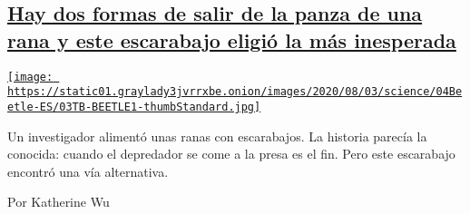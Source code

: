 \begin{enumerate}
\begin{enumerate}
{    \subsection{\texorpdfstring{\href{/es/2020/08/04/espanol/ciencia-y-tecnologia/escarabajo-excremento-rana.html}{Hay
    dos formas de salir de la panza de una rana y este escarabajo eligió
    la más
    inesperada}}{Hay dos formas de salir de la panza de una rana y este escarabajo eligió la más inesperada}}\label{hay-dos-formas-de-salir-de-la-panza-de-una-rana-y-este-escarabajo-eligiuxf3-la-muxe1s-inesperada}}

    \href{/es/2020/08/04/espanol/ciencia-y-tecnologia/escarabajo-excremento-rana.html}{\texttt{[image: https://static01.graylady3jvrrxbe.onion/images/2020/08/03/science/04Beetle-ES/03TB-BEETLE1-thumbStandard.jpg]}}

    Un investigador alimentó unas ranas con escarabajos. La historia
    parecía la conocida: cuando el depredador se come a la presa es el
    fin. Pero este escarabajo encontró una vía alternativa.

    Por Katherine Wu
  \end{enumerate}
\end{enumerate}

